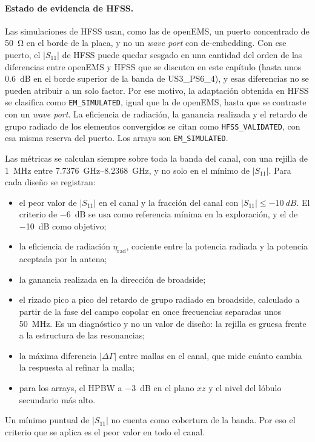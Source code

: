 \documentclass[11pt,a4paper]{article}
\begin{document}
\paragraph{Estado de evidencia de HFSS.} Las simulaciones de HFSS usan, como las de openEMS, un puerto concentrado de \SI{50}{\ohm} en el borde de la placa, y no un \textit{wave port} con de-embedding. Con ese puerto, el $|S_{11}|$ de HFSS puede quedar sesgado en una cantidad del orden de las diferencias entre openEMS y HFSS que se discuten en este capítulo (hasta unos \SI{0.6}{dB} en el borde superior de la banda de US3\_PS6\_4), y esas diferencias no se pueden atribuir a un solo factor. Por ese motivo, la adaptación obtenida en HFSS se clasifica como \texttt{EM\_SIMULATED}, igual que la de openEMS, hasta que se contraste con un \textit{wave port}. La eficiencia de radiación, la ganancia realizada y el retardo de grupo radiado de los elementos convergidos se citan como \texttt{HFSS\_VALIDATED}, con esa misma reserva del puerto. Los arrays son \texttt{EM\_SIMULATED}.

Las métricas se calculan siempre sobre toda la banda del canal, con una rejilla de \SI{1}{MHz}
entre \SIrange{7.7376}{8.2368}{GHz}, y no solo en el mínimo de $|S_{11}|$. Para cada diseño se
registran:
\begin{itemize}
    \item el peor valor de $|S_{11}|$ en el canal y la fracción del canal con $|S_{11}| \le \SI{-10}{dB}$.
    El criterio de \SI{-6}{dB} se usa como referencia mínima en la exploración, y el de \SI{-10}{dB}
    como objetivo;
    \item la eficiencia de radiación $\eta_\mathrm{rad}$, cociente entre la potencia radiada y la
    potencia aceptada por la antena;
    \item la ganancia realizada en la dirección de broadside;
    \item el rizado pico a pico del retardo de grupo radiado en broadside, calculado a partir de la
    fase del campo copolar en once frecuencias separadas unos \SI{50}{MHz}. Es un diagnóstico y no
    un valor de diseño: la rejilla es gruesa frente a la estructura de las resonancias;
    \item la máxima diferencia $|\Delta\Gamma|$ entre mallas en el canal, que mide cuánto cambia la
    respuesta al refinar la malla;
    \item para los arrays, el HPBW a \SI{-3}{dB} en el plano $xz$ y el nivel del lóbulo secundario más alto.
\end{itemize}
Un mínimo puntual de $|S_{11}|$ no cuenta como cobertura de la banda. Por eso el criterio que se
aplica es el peor valor en todo el canal.
\end{document}
